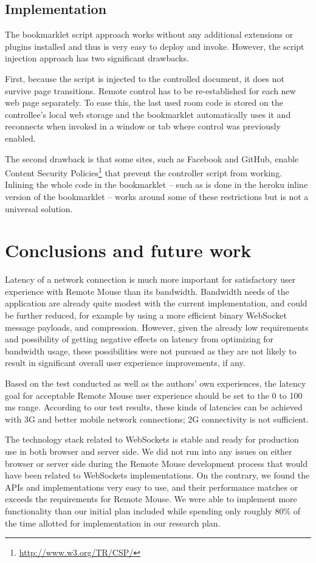 \documentclass[a4paper,english,twocolumn]{article}
\begin{document}
\subsection*{Implementation}

The bookmarklet script approach works without any additional
extensions or plugins installed and thus is very easy to deploy and
invoke. However, the script injection approach has two significant
drawbacks.

First, because the script is injected to the controlled document, it
does not survive page transitions. Remote control has to be
re-established for each new web page separately. To ease this, the
last used room code is stored on the controllee's local web storage
and the bookmarklet automatically uses it and reconnects when invoked
in a window or tab where control was previously enabled.

The second drawback is that some sites, such as Facebook and GitHub,
enable Content Security
Policies\footnote{\url{http://www.w3.org/TR/CSP/}} that prevent the
controller script from working. Inlining the whole code in the
bookmarklet -- such as is done in the heroku inline version of the
bookmarklet -- works around some of these restrictions but is not a
universal solution.

\section{Conclusions and future work}

Latency of a network connection is much more important for
satisfactory user experience with Remote Mouse than its
bandwidth. Bandwidth needs of the application are already quite modest
with the current implementation, and could be further reduced, for
example by using a more efficient binary WebSocket message payloads,
and compression. However, given the already low requirements and
possibility of getting negative effects on latency from optimizing for
bandwidth usage, these possibilities were not pursued as they are not
likely to result in significant overall user experience improvements,
if any.

Based on the test conducted as well as the authors' own experiences,
the latency goal for acceptable Remote Mouse user experience should be
set to the 0 to 100 ms range. According to our test results, these
kinds of latencies can be achieved with 3G and better mobile network
connections; 2G connectivity is not sufficient.

The technology stack related to WebSockets is stable and ready for
production use in both browser and server side. We did not run into
any issues on either browser or server side during the Remote Mouse
development process that would have been related to WebSockets
implementations. On the contrary, we found the APIs and
implementations very easy to use, and their performance matches or
exceeds the requirements for Remote Mouse. We were able to implement
more functionality than our initial plan included while spending only
roughly 80\% of the time allotted for implementation in our research
plan.
\end{document}
